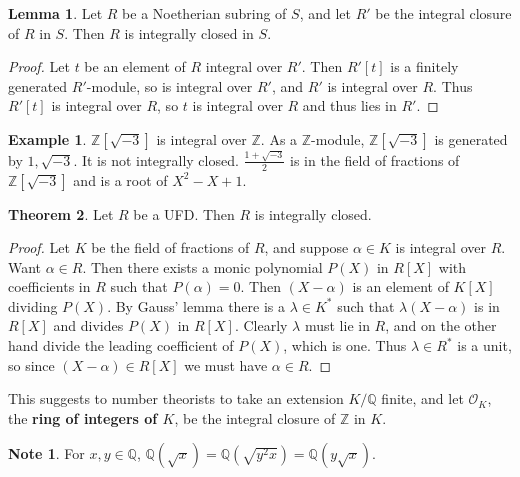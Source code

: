 \documentclass{article}
\newcommand{\Z}{\mathbb{Z}}
\newcommand{\Q}{\mathbb{Q}}
\newcommand{\rb}[1]{\left( #1 \right)}
\renewcommand{\sb}[1]{\left[ #1 \right]}
\theoremstyle{definition}\newtheorem{definition}{Definition}[subsection]
\theoremstyle{definition}\newtheorem{remark}[definition]{Remark}
\theoremstyle{definition}\newtheorem*{example}{Example}
\theoremstyle{definition}\newtheorem*{note}{Note}
\newtheorem{lemma}[definition]{Lemma}
\newtheorem{theorem}[definition]{Theorem}
\begin{document}
\begin{lemma}
Let $ R $ be a Noetherian subring of $ S $, and let $ R' $ be the integral closure of $ R $ in $ S $. Then $ R $ is integrally closed in $ S $.
\end{lemma}

\begin{proof}
Let $ t $ be an element of $ R $ integral over $ R' $. Then $ R'\sb{t} $ is a finitely generated $ R' $-module, so is integral over $ R' $, and $ R' $ is integral over $ R $. Thus $ R'\sb{t} $ is integral over $ R $, so $ t $ is integral over $ R $ and thus lies in $ R' $.
\end{proof}

\begin{example}
$ \Z\sb{\sqrt{-3}} $ is integral over $ \Z $. As a $ \Z $-module, $ \Z\sb{\sqrt{-3}} $ is generated by $ 1, \sqrt{-3} $. It is not integrally closed. $ \tfrac{1 + \sqrt{-3}}{2} $ is in the field of fractions of $ \Z\sb{\sqrt{-3}} $ and is a root of $ X^2 - X + 1 $.
\end{example}

\begin{theorem}
Let $ R $ be a UFD. Then $ R $ is integrally closed.
\end{theorem}

\begin{proof}
Let $ K $ be the field of fractions of $ R $, and suppose $ \alpha \in K $ is integral over $ R $. Want $ \alpha \in R $. Then there exists a monic polynomial $ P\rb{X} $ in $ R\sb{X} $ with coefficients in $ R $ such that $ P\rb{\alpha} = 0 $. Then $ \rb{X - \alpha} $ is an element of $ K\sb{X} $ dividing $ P\rb{X} $. By Gauss' lemma there is a $ \lambda \in K^* $ such that $ \lambda\rb{X - \alpha} $ is in $ R\sb{X} $ and divides $ P\rb{X} $ in $ R\sb{X} $. Clearly $ \lambda $ must lie in $ R $, and on the other hand divide the leading coefficient of $ P\rb{X} $, which is one. Thus $ \lambda \in R^* $ is a unit, so since $ \rb{X - \alpha} \in R\sb{X} $ we must have $ \alpha \in R $.
\end{proof}

This suggests to number theorists to take an extension $ K / \Q $ finite, and let $ \mathcal{O}_K $, the \textbf{ring of integers of $ K $}, be the integral closure of $ \Z $ in $ K $.

\begin{note}
For $ x, y \in \Q $, $ \Q\rb{\sqrt{x}} = \Q\rb{\sqrt{y^2x}} = \Q\rb{y\sqrt{x}} $.
\end{note}
\end{document}
